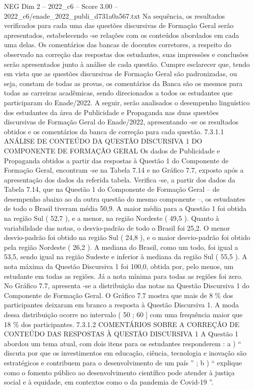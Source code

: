 \begin{textsample}{NEG Dim 2 – 2022\_c6 – Score 3.00 – 2022\_c6/enade\_2022\_publi\_d731a0a567.txt}
Na sequência, os resultados verificados para cada uma das questões discursivas de Formação Geral serão apresentados, estabelecendo -se relações com os conteúdos abordados em cada uma delas.
Os comentários das bancas de docentes corretores, a respeito do observado na correção das respostas dos estudantes, suas impressões e conclusões serão apresentados junto à análise de cada questão.
Cumpre esclarecer que, tendo em vista que as questões discursivas de Formação Geral são padronizadas, ou seja, constam de todas as provas, os comentários da Banca são os mesmos para todas as carreiras acadêmicas, sendo direcionados a todos os estudantes que participaram do Enade/2022.
A seguir, serão analisados o desempenho linguístico dos estudantes da área de Publicidade e Propaganda nas duas questões discursivas de Formação Geral do Enade/2022, apresentando -se os resultados obtidos e os comentários da banca de correção para cada questão. 7.3.1.1 ANÁLISE DE CONTEÚDO DA QUESTÃO DISCURSIVA 1 DO COMPONENTE DE FORMAÇÃO GERAL Os dados de Publicidade e Propaganda obtidos a partir das respostas à Questão 1 do Componente de Formação Geral, encontram -se na Tabela 7.14 e no Gráfico 7.7, exposto após a apresentação dos dados da referida tabela.
Verifica -se, a partir dos dados da Tabela 7.14, que na Questão 1 do Componente de Formação Geral – de desempenho abaixo ao da outra questão do mesmo componente –, os estudantes de todo o Brasil tiveram média 50,9.
A maior média para a Questão 1 foi obtida na região Sul ( 52,7 ), e a menor, na região Nordeste ( 49,5 ).
Quanto à variabilidade das notas, o desvio-padrão de todo o Brasil foi 25,2.
O menor desvio-padrão foi obtido na região Sul ( 24,8 ), e o maior desvio-padrão foi obtido pela região Nordeste ( 26,2 ).
A mediana do Brasil, como um todo, foi igual a 53,5, sendo igual na região Sudeste e inferior à mediana da região Sul ( 55,5 ).
A nota máxima da Questão Discursiva 1 foi 100,0, obtida por, pelo menos, um estudante em todas as regiões.
Já a nota mínima para todas as regiões foi zero.
No Gráfico 7.7, apresenta -se a distribuição das notas na Questão Discursiva 1 do Componente de Formação Geral.
O Gráfico 7.7 mostra que mais de 8 \% dos participantes deixaram em branco a resposta à Questão Discursiva 1.
A moda dessa distribuição ocorre no intervalo ( 50 ; 60 ] com uma frequência maior que 18 \% dos participantes. 7.3.1.2 COMENTÁRIOS SOBRE A CORREÇÃO DE CONTEÚDO DAS RESPOSTAS À QUESTÃO DISCURSIVA 1 A Questão 1 abordou um tema atual, com dois itens para os estudantes responderem : a ) “ discuta por que os investimentos em educação, ciência, tecnologia e inovação são estratégicos e contribuem para o desenvolvimento de um país ” ; b ) “ explique como o fomento público ao desenvolvimento científico pode atender à justiça social e à equidade, em contextos como o da pandemia de Covid-19 ”.

\end{textsample}
